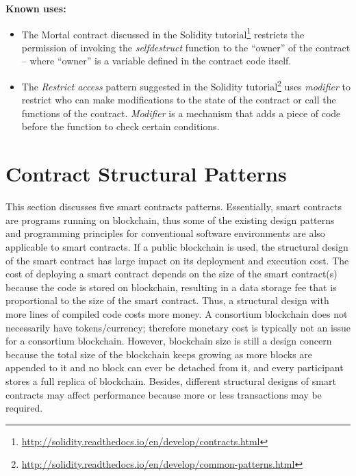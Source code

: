 \vspace{0.5em}\noindent \textbf{Known uses:}
\begin{itemize}
  \item The Mortal contract discussed in the Solidity tutorial\footnote{\url{http://solidity.readthedocs.io/en/develop/contracts.html}} restricts the permission of invoking the \textit{selfdestruct} function to the ``owner'' of the contract -- where ``owner'' is a variable defined in the contract code itself.
  \item The \textit{Restrict access} pattern suggested in the Solidity tutorial\footnote{\url{http://solidity.readthedocs.io/en/develop/common-patterns.html}} uses \textit{modifier} to restrict who can make modifications to the state of the contract or call the functions of the contract. \textit{Modifier} is a mechanism that adds a piece of code before the function to check certain conditions. %
\end{itemize}



\section{Contract Structural Patterns}
\label{sec:contractPatttern}

This section discusses five smart contracts patterns. Essentially, smart contracts are programs running on blockchain, thus some of the existing design patterns and programming principles for conventional software environments are also applicable to smart contracts. If a public blockchain is used, the structural design of the smart contract has large impact on its deployment and execution cost. The cost of deploying a smart contract depends on the size of the smart contract(s) because the code is stored on blockchain, resulting in a data storage fee that is proportional to the size of the smart contract. Thus, a structural design with more lines of compiled code costs more money. A consortium blockchain does not necessarily have tokens/currency; therefore monetary cost is typically not an issue for a consortium blockchain. However, blockchain size is still a design concern because the total size of the blockchain keeps growing as more blocks are appended to it and no block can ever be detached from it, and every participant stores a full replica of blockchain. Besides, different structural designs of smart contracts may affect performance because more or less transactions may be required.



